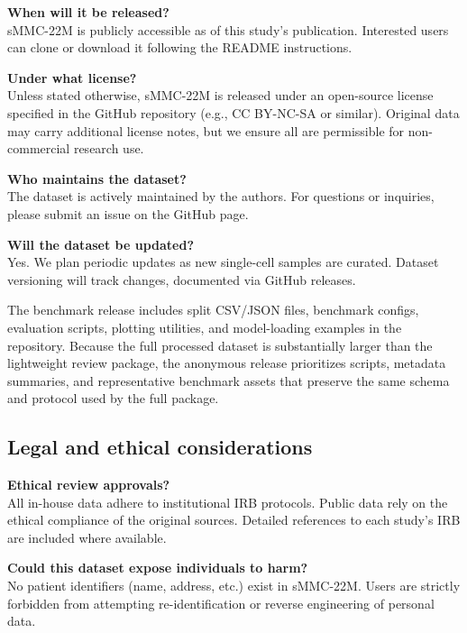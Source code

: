 \documentclass{article}
\newcommand{\dataset}{sMMC-22M\xspace}
\begin{document}
\noindent
\textbf{When will it be released?} \\
\dataset is publicly accessible as of this study’s publication. Interested users can clone or download it following the README instructions.

\noindent
\textbf{Under what license?} \\
Unless stated otherwise, \dataset is released under an open-source license specified in the GitHub repository (e.g., CC BY-NC-SA or similar). Original data may carry additional license notes, but we ensure all are permissible for non-commercial research use.

\noindent
\textbf{Who maintains the dataset?} \\
The dataset is actively maintained by the authors. For questions or inquiries, please submit an issue on the GitHub page.

\noindent
\textbf{Will the dataset be updated?} \\
Yes. We plan periodic updates as new single-cell samples are curated. Dataset versioning will track changes, documented via GitHub releases.

The benchmark release includes split CSV/JSON files, benchmark configs, evaluation scripts, plotting utilities, and model-loading examples in the repository. Because the full processed dataset is substantially larger than the lightweight review package, the anonymous release prioritizes scripts, metadata summaries, and representative benchmark assets that preserve the same schema and protocol used by the full package.


\subsection{Legal and ethical considerations}
\noindent
\textbf{Ethical review approvals?} \\
All in-house data adhere to institutional IRB protocols. Public data rely on the ethical compliance of the original sources. Detailed references to each study’s IRB are included where available.

\noindent
\textbf{Could this dataset expose individuals to harm?} \\
No patient identifiers (name, address, etc.) exist in \dataset. Users are strictly forbidden from attempting re-identification or reverse engineering of personal data.
\end{document}
